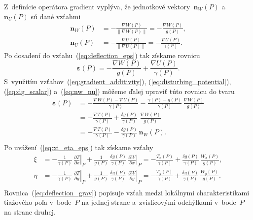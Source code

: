\documentclass[a4paper, 12pt]{book}
\let\vec\mathbf
\begin{document}
Z~definície operátora gradient vyplýva, že jednotkové vektory~$\vec n_W(P)$ 
a~$\vec n_U(P)$ sú dané vzťahmi
%
\begin{equation}
\label{eq:nw_nu}
\begin{split}
\vec n_W(P) &= -\frac{\nabla W(P)}{\| \nabla W(P) \|} = -\frac{\nabla 
W(P)}{g(P)}{,}\\
%
\vec n_U(P) &= -\frac{\nabla U(P)}{\| \nabla U(P) \|} = -\frac{\nabla 
U(P)}{\gamma(P)}{.}
\end{split}
\end{equation}
%
Po dosadení do vzťahu~(\ref{eq:deflection_eps}) tak získame rovnicu
%
\begin{equation}
\label{eq:deflection_eps2}
\boldsymbol\varepsilon(P) = -\frac{\nabla W(P)}{g(P)} + \frac{\nabla 
U(P)}{\gamma(P)}{.}
\end{equation}
%
S~využitím vzťahov~(\ref{eq:gradient_additivity}), 
(\ref{eq:disturbing_potential}),  (\ref{eq:dg_scalar}) a~(\ref{eq:nw_nu}) 
môžeme ďalej upraviť túto rovnicu do tvaru
%
\begin{equation}
\label{eq:deflection_eps3}
\begin{split}
\boldsymbol\varepsilon(P) &= - \frac{\nabla W(P) - \nabla U(P)}{\gamma(P)} 
- \frac{\gamma(P) - g(P)}{\gamma(P)} \, \frac{\nabla W(P)}{g(P)}\\
%
&= - \frac{\nabla T(P)}{\gamma(P)} + \frac{\delta g(P)}{\gamma(P)} \,  \, 
\frac{\nabla W(P)}{g(P)}\\
%
&= - \frac{\nabla T(P)}{\gamma(P)} - \frac{\delta g(P)}{\gamma(P)} \, \vec 
n_W(P){.}\\
\end{split}
\end{equation}
%
Po uvážení~(\ref{eq:xi_eta_eps}) tak získame vzťahy
%
\begin{equation}
\label{eq:deflection_grav}
\begin{split}
\xi &= -\frac{1}{\gamma(P)} \, \left.\frac{\partial T}{\partial x}\right|_{P} 
+ \frac{1}{g(P)} \, \frac{\delta g(P)}{\gamma(P)} \, \left.\frac{\partial 
W}{\partial x}\right|_P = -\frac{T_x(P)}{\gamma(P)} + \frac{\delta 
g(P)}{\gamma(P)} \, \frac{W_x(P)}{g(P)}{,}\\
%
\eta &= -\frac{1}{\gamma(P)} \, \left.\frac{\partial T}{\partial y}\right|_{P} 
+ \frac{1}{g(P)} \, \frac{\delta g(P)}{\gamma(P)} \, \left.\frac{\partial 
W}{\partial y}\right|_P= -\frac{T_y(P)}{\gamma(P)} + \frac{\delta 
g(P)}{\gamma(P)} \, \frac{W_y(P)}{g(P)}{.}\\
\end{split}
\end{equation}
%
Rovnica~(\ref{eq:deflection_grav}) popisuje vzťah medzi lokálnymi 
charakteristikami tiažového poľa v~bode~$P$ na jednej strane a~zvislicovými 
odchýlkami v~bode~$P$ na strane druhej.
\end{document}
